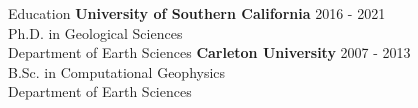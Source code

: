 \begin{rSection}{Education}
    {\bf University of Southern California} \hfill 2016 - 2021 \\
    Ph.D. in Geological Sciences \\%
    Department of Earth Sciences
    \smallbreak
    {\bf Carleton University} \hfill 2007 - 2013\\
    B.Sc. in Computational Geophysics \\%
    Department of Earth Sciences  
\end{rSection}